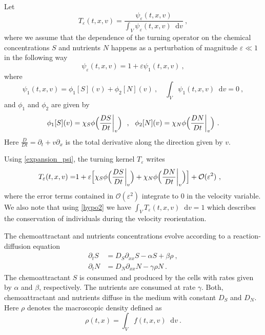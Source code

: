 \documentclass[11pt,twoside]{article}
\theoremstyle{nonumberplain}
\newcommand*\diff{\mathop{}\!\mathrm{d}}
\begin{document}
Let 
\begin{equation}\label{TepsFeps}
    T_\varepsilon(t,x,v)=\frac{\psi_\varepsilon(t,x,{v}) }{\displaystyle\int_{V}\psi_\varepsilon(t,x,{v})  \diff {v}}\ ,
\end{equation}
where we assume that the dependence of the turning operator on the chemical concentrations $S$ and nutrients $N$ happens as a perturbation of magnitude $\varepsilon\ll 1$ in the following way
\begin{equation}\label{expansion_psi}
    \psi_\varepsilon(t,x,{v})=1+\varepsilon\psi_1(t,x,{v})\ ,
\end{equation}
where 
\begin{equation}
\psi_1(t,x,{v}) = \phi_1[S]({v}) + \phi_2[N]({v})\ , \quad\int_V\psi_1(t,x,{v})\diff {v}=0 \ , \label{hypo2}
\end{equation}
and $\phi_1$ and $\phi_2$ are given by
$$\phi_1[S]({v})=\chi_S\phi\Bigl(\frac{DS}{Dt}\bigg\rvert_{v}\Bigr)\ \ ,\ \ \phi_2[N](v)= \chi_N\phi\Bigl(\frac{DN}{Dt}\bigg\rvert_{v}\Bigr)\ .$$
 Here $\frac{D}{Dt}=\partial_t+{v}\partial_x$ is the total derivative along the direction given by ${v}$.


 
Using \eqref{expansion_psi}, the turning kernel $T_\varepsilon$ writes
\begin{align}
    T_\varepsilon(t,x,{v})=& 1+\varepsilon\Bigl[\chi_S\phi\Bigl(\frac{DS}{Dt}\bigg\rvert_{v}\Bigr)+ \chi_N\phi\Bigl(\frac{DN}{Dt}\bigg\rvert_{v}\Bigr)\Bigr]  + {\mathcal{O}(\varepsilon^2)} \ ,\label{eq: turning operator scaled}
\end{align}
{where the error terms contained in $\mathcal{O}(\varepsilon^2)$ integrate to $0$ in the velocity variable. We also note that using \eqref{hypo2} we have $\int_V T_\varepsilon(t,x,v)\diff v=1$ which describes the conservation of individuals during the velocity reorientation.}

The chemoattractant and nutrients concentrations evolve according to a reaction-diffusion equation
\begin{align}
    \partial_t S&=D_S\partial_{xx}S-\alpha S+\beta \rho\ ,\\
    \partial_t N&=D_N\partial_{xx}N-\gamma\rho N\ .
\end{align}
The chemoattractant $S$ is consumed and produced by the cells with rates given by $\alpha$ and $\beta$, respectively. The nutrients are consumed at rate $\gamma$. Both, chemoattractant and nutrients diffuse in the medium with constant $D_S$ and $D_N$. Here $\rho$ denotes the macroscopic density defined as
\[
\rho(t,x)=\int_Vf(t,x,v)\diff v\ .
\]
\end{document}
